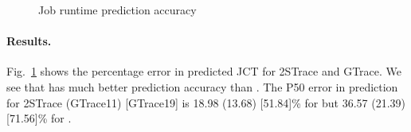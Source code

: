 {{\begin{figure}[tp]
\centering
{}
\hspace{-0.25in}
\hspace{-0.25in}
\vspace{-0.15in}
	\caption{Job runtime prediction accuracy }
\vspace{-0.15in}
\label{fig:sim:estimationAccuracy}
\end{figure}

\paragraph{Results.}
{Fig.~\ref{fig:sim:estimationAccuracy} shows the percentage error in predicted JCT for 
  2STrace and GTrace.
}
{We see that \slearn has much better prediction accuracy than
\primarybasepredict.} The P50 error in prediction for 2STrace (GTrace11) [GTrace19] is 18.98
(13.68) [51.84]\% for \namepredict but 36.57 (21.39) [71.56]\% for \primarybasepredict.

}}
